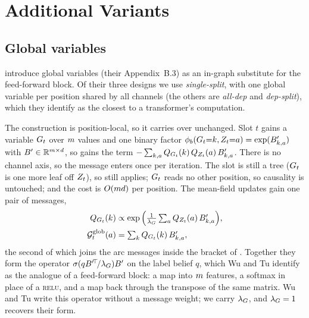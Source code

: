 \section{Additional Variants}
\label{app:variants}

\subsection{Global variables}
\label{app:globals}

\citet{wu2023probabilistic} introduce global variables (their Appendix~B.3) as an in-graph
substitute for the feed-forward block. Of their three designs we use \emph{single-split}, with
one global variable per position shared by all channels (the others are \emph{all-dep} and
\emph{dep-split}), which they identify as the closest to a transformer's computation.

The construction is position-local, so it carries over unchanged. Slot $t$ gains a variable
$G_{t}$ over $m$ values and one binary factor
$\phi_b(G_{t}{=}k, Z_{t}{=}a) = \exp(B'_{k,a})$ with
$B' \in \mathbb{R}^{m \times d}$, so  gains the term
$-\sum_{k,a} Q_{G_{t}}(k)\,Q_{Z_{t}}(a)\,B'_{k,a}$. There is no channel axis, so the message
enters once per iteration. The slot is still a tree ($G_{t}$ is one more leaf off $Z_{t}$), so
 still applies; $G_{t}$ reads no other position, so causality is
untouched; and the cost is $O(md)$ per position. The mean-field updates gain one pair
of messages,
%
\begin{equation}
\label{eq:global-update}
\begin{aligned}
  Q_{G_{t}}(k) &\propto \exp\Big(\tfrac{1}{\lambda_G}\textstyle\sum_a Q_{Z_{t}}(a)\,B'_{k,a}\Big),\\
  \mathcal{G}^{\mathrm{glob}}_{t}(a) &= \textstyle\sum_k Q_{G_{t}}(k)\,B'_{k,a},
\end{aligned}
\end{equation}
%
the second of which joins the arc messages inside the bracket of . Together
they form the operator $\sigma(qB'^{\!\top}\!/\lambda_G)B'$ on the label belief $q$, which
Wu and Tu identify as the analogue of a feed-forward block: a map into $m$ features, a
softmax in place of a \textsc{relu}, and a map back through the transpose of the same matrix.
Wu and Tu write this operator without a message weight; we carry $\lambda_G$, and $\lambda_G = 1$
recovers their form.

